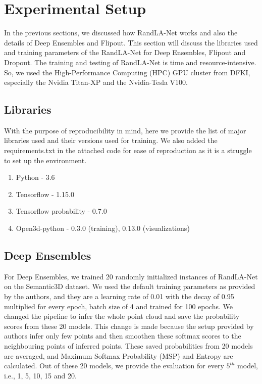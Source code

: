 \section{Experimental Setup}
    In the previous sections, we discussed how RandLA-Net works and also the details of Deep Ensembles and Flipout.
    This section will discuss the libraries used and training parameters of the RandLA-Net for Deep Ensembles, Flipout and Dropout.    The training and testing of RandLA-Net is time and resource-intensive.
    So, we used the High-Performance Computing (HPC) GPU cluster from DFKI, especially the Nvidia Titan-XP and the Nvidia-Tesla V100.
    \subsection{Libraries}
    With the purpose of reproducibility in mind, here we provide the list of major libraries used and their versions used for training.
    We also added the requirements.txt in the attached code for ease of reproduction as it is a struggle to set up the environment.
    \begin{enumerate}
        \item Python - 3.6
        \item Tensorflow - 1.15.0
        \item Tensorflow probability - 0.7.0
        \item Open3d-python - 0.3.0 (training), 0.13.0 (visualizations)
    \end{enumerate}
    
    \subsection{Deep Ensembles}
    \label{sec:de_setup}
    For Deep Ensembles, we trained 20 randomly initialized instances of RandLA-Net on the Semantic3D dataset.
    We used the default training parameters as provided by the authors, and they are a learning rate of 0.01 with the decay of 0.95 multiplied for every epoch, batch size of 4 and trained for 100 epochs.
    We changed the pipeline to infer the whole point cloud and save the probability scores from these 20 models.
    This change is made because the setup provided by authors infer only few points and then smoothen these softmax scores to the neighbouring points of inferred points.
    These saved probabilities from 20 models are averaged, and Maximum Softmax Probability (MSP) and Entropy are calculated.
    Out of these 20 models, we provide the evaluation for every $5^{th}$ model, i.e., 1, 5, 10, 15 and 20.
